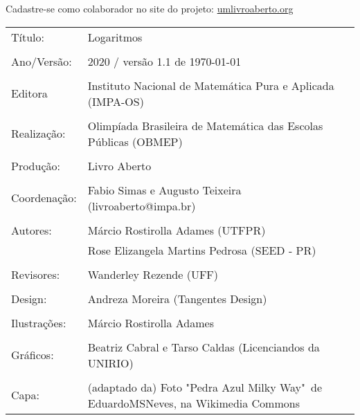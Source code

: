 \vspace*{.3cm}

Cadastre-se como colaborador no site do projeto: \url{umlivroaberto.org}




\begin{tabular}{p{}p{}}
Título: & Logaritmos\\
\\
Ano/Versão: & 2020 / versão 1.1 de \today\\
\\
Editora & Instituto Nacional de Matem\'atica Pura e Aplicada (IMPA-OS)\\
\\
Realização:& Olimp\'iada Brasileira de Matem\'atica das Escolas P\'ublicas (OBMEP)\\
\\
Produção:& Livro Aberto\\
\\
Coordenação:& Fabio Simas e Augusto Teixeira (livroaberto@impa.br)\\
\\
  Autores: & Márcio Rostirolla Adames (UTFPR)\\
             & Rose Elizangela Martins Pedrosa (SEED - PR)\\
\\
Revisores: & Wanderley Rezende (UFF) \\
                
\\
Design: & Andreza Moreira (Tangentes Design)\\
\\
  Ilustrações: & Márcio Rostirolla Adames \\ 
\\
Gráficos: & Beatriz Cabral e Tarso Caldas (Licenciandos da UNIRIO)\\
\\
Capa: & (adaptado da) Foto "Pedra Azul Milky Way"\, de EduardoMSNeves, na Wikimedia Commons  \\

\end{tabular}
\vspace{.5cm}



